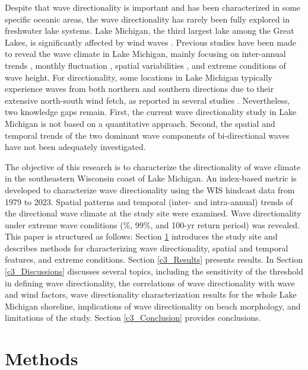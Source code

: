 Despite that wave directionality is important and has been characterized in some
specific oceanic areas, the wave directionality has rarely been fully explored
in freshwater lake systems. Lake Michigan, the third largest lake among the
Great Lakes, is significantly affected by wind waves
\citep{huang_impacts_2021,huang_wave_2021}. Previous studies have been made to
reveal the wave climate in Lake Michigan, mainly focusing on inter-annual trends
\citep{olsen_long_2019,jabbari_increases_2021}, monthly fluctuation
\citep{meadows_relationship_1997,huang_wave_2021}, spatial variabilities
\citep{huang_wave_2021}, and extreme conditions
\citep{sogut_characterizing_2018} of wave height. For directionality, some
locations in Lake Michigan typically experience waves from both northern and
southern directions due to their extensive north-south wind fetch, as reported
in several studies 
\citep[\eg][]{davidson-arnott_wave_1980,booth_wave_1994,olsen_long_2019,abdelhady_shoreline_2025}.
Nevertheless, two knowledge gaps remain. First, the current wave directionality
study in Lake Michigan is not based on a quantitative approach. Second, the
spatial and temporal trends of the two dominant wave components of
bi-directional waves have not been adequately investigated.

The objective of this research is to characterize the directionality of wave
climate in the southeastern Wisconsin coast of Lake Michigan. An index-based
metric is developed to characterize wave directionality using the WIS hindcast
data from 1979 to 2023. Spatial patterns and temporal (\eg inter- and
intra-annual) trends of the directional wave climate at the study site were
examined. Wave directionality under extreme wave conditions (\%, 99\%, and
100-yr return period) was revealed. This paper is structured as follows: Section
\ref{c3_Methods} introduces the study site and describes methods for
characterizing wave directionality, spatial and temporal features, and extreme
conditions. Section \ref{c3_Results} presents results. In Section
\ref{c3_Discussions} discusses several topics, including the sensitivity of the
threshold in defining wave directionality, the correlations of wave
directionality with wave and wind factors, wave directionality characterization
results for the whole Lake Michigan shoreline, implications of wave
directionality on beach morphology, and limitations of the study. Section
\ref{c3_Conclusion} provides conclusions.

\section{Methods}
\label{c3_Methods}

